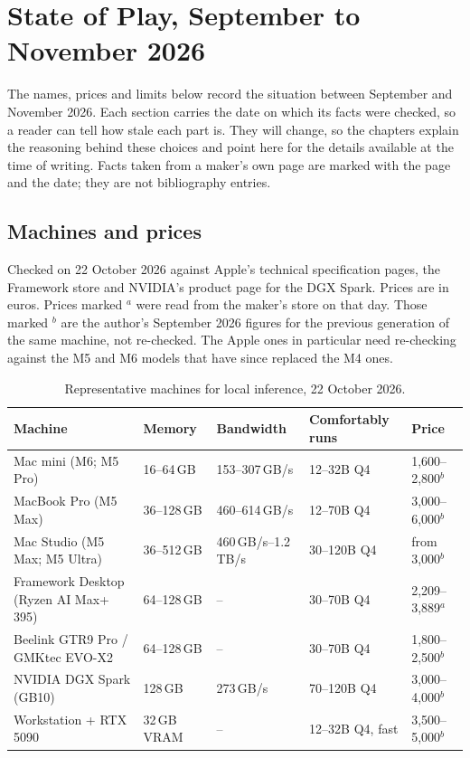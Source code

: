 \chapter{State of Play, September to November 2026}
\label{app:stateofplay}

The names, prices and limits below record the situation between September and
November 2026. Each section carries the date on which its facts were checked,
so a reader can tell how stale each part is. They will change, so the chapters
explain the reasoning behind these choices and point here for the details
available at the time of writing. Facts taken from a maker's own page are
marked with the page and the date; they are not bibliography entries.

\section{Machines and prices}

Checked on 22 October 2026 against Apple's technical specification pages, the
Framework store and NVIDIA's product page for the DGX Spark. Prices are in
euros. Prices marked $^{a}$ were read from the maker's store on that day.
Those marked $^{b}$ are the author's September 2026 figures for the previous
generation of the same machine, not re-checked. The Apple ones in particular
need re-checking against the M5 and M6 models that have since replaced the M4
ones.

\begin{table}[htbp]
\centering
\caption{Representative machines for local inference, 22 October 2026.}
\label{tab:hardware}
\footnotesize
\begin{tabularx}{\textwidth}{Xllll}
\toprule
\textbf{Machine} & \textbf{Memory} & \textbf{Bandwidth} & \textbf{Comfortably runs} & \textbf{Price} \\
\midrule
Mac mini (M6; M5 Pro)                & 16--64\,GB   & 153--307\,GB/s   & 12--32B Q4       & 1{,}600--2{,}800$^{b}$ \\
MacBook Pro (M5 Max)                 & 36--128\,GB  & 460--614\,GB/s   & 12--70B Q4       & 3{,}000--6{,}000$^{b}$ \\
Mac Studio (M5 Max; M5 Ultra)        & 36--512\,GB  & 460\,GB/s--1.2\,TB/s & 30--120B Q4  & from 3{,}000$^{b}$ \\
Framework Desktop (Ryzen AI Max+ 395) & 64--128\,GB & --               & 30--70B Q4       & 2{,}209--3{,}889$^{a}$ \\
Beelink GTR9 Pro / GMKtec EVO-X2     & 64--128\,GB  & --               & 30--70B Q4       & 1{,}800--2{,}500$^{b}$ \\
NVIDIA DGX Spark (GB10)              & 128\,GB      & 273\,GB/s        & 70--120B Q4      & 3{,}000--4{,}000$^{b}$ \\
Workstation + RTX 5090               & 32\,GB VRAM  & --               & 12--32B Q4, fast & 3{,}500--5{,}000$^{b}$ \\
\bottomrule
\end{tabularx}
\end{table}

